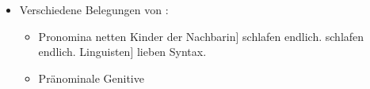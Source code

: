 \begin{frame}

\begin{itemize}
	\item Verschiedene Belegungen von :
	\begin{itemize}
		
		\item Pronomina
		\eal
		\ex {[} netten Kinder der Nachbarin{]} schlafen endlich.
		\ex {[}\alertred{Sie}{]} schlafen endlich.
		\ex {[} Linguisten{]} lieben Syntax.
		\zl

\pause
		\item Pränominale Genitive
		\eal 
		\zl
		
	\end{itemize}
\end{itemize}

\end{frame}


